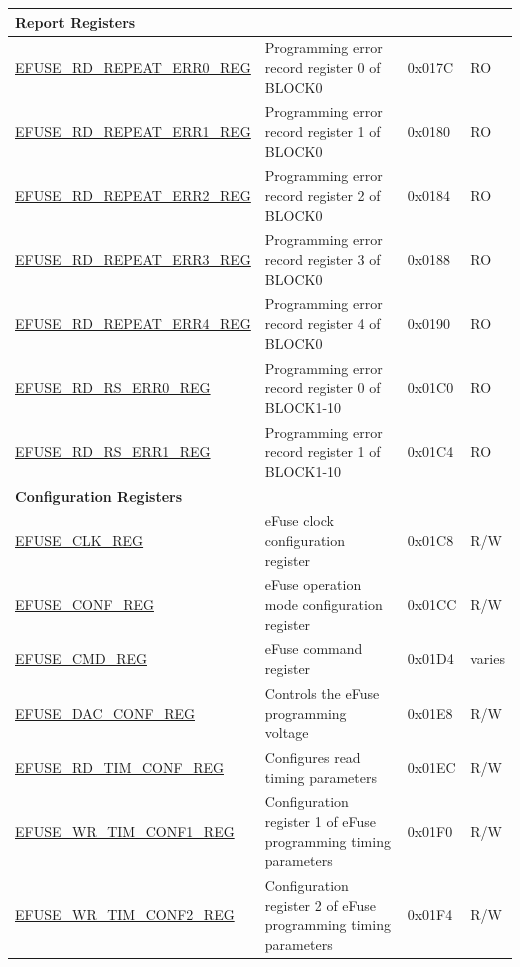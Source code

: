 \begin{longtable}{ | p{5.8cm} | p{7cm} | p{1.3cm} | p{1.2cm} | }
\multicolumn{4}{|l|}{\textbf{Report Registers}} \\ \hline
\hyperref[regdesc:EFUSERDREPEATERR0REG]{EFUSE\_RD\_REPEAT\_ERR0\_REG} & Programming error record register 0 of BLOCK0 & 0x017C & RO \\ \hline
\hyperref[regdesc:EFUSERDREPEATERR1REG]{EFUSE\_RD\_REPEAT\_ERR1\_REG} & Programming error record register 1 of BLOCK0 & 0x0180 & RO \\ \hline
\hyperref[regdesc:EFUSERDREPEATERR2REG]{EFUSE\_RD\_REPEAT\_ERR2\_REG} & Programming error record register 2 of BLOCK0 & 0x0184 & RO \\ \hline
\hyperref[regdesc:EFUSERDREPEATERR3REG]{EFUSE\_RD\_REPEAT\_ERR3\_REG} & Programming error record register 3 of BLOCK0 & 0x0188 & RO \\ \hline
\hyperref[regdesc:EFUSERDREPEATERR4REG]{EFUSE\_RD\_REPEAT\_ERR4\_REG} & Programming error record register 4 of BLOCK0 & 0x0190 & RO \\ \hline
\hyperref[regdesc:EFUSERDRSERR0REG]{EFUSE\_RD\_RS\_ERR0\_REG} & Programming error record register 0 of BLOCK1-10 & 0x01C0 & RO \\ \hline
\hyperref[regdesc:EFUSERDRSERR1REG]{EFUSE\_RD\_RS\_ERR1\_REG} & Programming error record register 1 of BLOCK1-10 & 0x01C4 & RO \\ \hline
\multicolumn{4}{|l|}{\textbf{Configuration Registers}} \\ \hline
\hyperref[regdesc:EFUSECLKREG]{EFUSE\_CLK\_REG} & eFuse clock configuration register & 0x01C8 & R/W \\ \hline
\hyperref[regdesc:EFUSECONFREG]{EFUSE\_CONF\_REG} & eFuse operation mode configuration register & 0x01CC & R/W \\ \hline
\hyperref[regdesc:EFUSECMDREG]{EFUSE\_CMD\_REG} & eFuse command register & 0x01D4 & varies \\ \hline
\hyperref[regdesc:EFUSEDACCONFREG]{EFUSE\_DAC\_CONF\_REG} & Controls the eFuse programming voltage & 0x01E8 & R/W \\ \hline
\hyperref[regdesc:EFUSERDTIMCONFREG]{EFUSE\_RD\_TIM\_CONF\_REG} & Configures read timing parameters & 0x01EC & R/W \\ \hline
\hyperref[regdesc:EFUSEWRTIMCONF1REG]{EFUSE\_WR\_TIM\_CONF1\_REG} & Configuration register 1 of eFuse programming timing parameters & 0x01F0 & R/W \\ \hline
\hyperref[regdesc:EFUSEWRTIMCONF2REG]{EFUSE\_WR\_TIM\_CONF2\_REG} & Configuration register 2 of eFuse programming timing parameters & 0x01F4 & R/W \\ \hline

\end{longtable}
